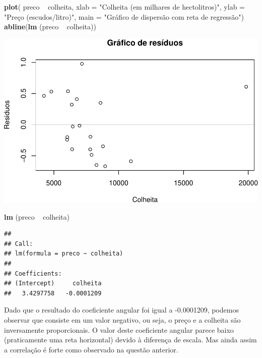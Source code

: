 \documentclass[11pt,]{article}
\makeatletter
\newenvironment{Shaded}{\begin{snugshade}}{\end{snugshade}}
\newcommand{\KeywordTok}[1]{\textcolor[rgb]{0.13,0.29,0.53}{\textbf{{#1}}}}
\newcommand{\DataTypeTok}[1]{\textcolor[rgb]{0.13,0.29,0.53}{{#1}}}
\newcommand{\StringTok}[1]{\textcolor[rgb]{0.31,0.60,0.02}{{#1}}}
\newcommand{\NormalTok}[1]{{#1}}
\def\maxwidth{\ifdim\Gin@nat@width>\linewidth\linewidth
\else\Gin@nat@width\fi}
\let\Oldincludegraphics\includegraphics
\renewcommand{\includegraphics}[1]{\Oldincludegraphics[width=\maxwidth]{#1}}
\makeatother
\begin{document}
\begin{Shaded}
\begin{Highlighting}[]
\KeywordTok{plot}\NormalTok{( preco ~}\StringTok{ }\NormalTok{colheita, }
      \DataTypeTok{xlab =} \StringTok{"Colheita (em milhares de hectolitros)"}\NormalTok{,}
      \DataTypeTok{ylab =} \StringTok{"Preço (escudos/litro)"}\NormalTok{,}
      \DataTypeTok{main =} \StringTok{"Gráfico de dispersão com reta de regressão"}\NormalTok{)}
\KeywordTok{abline}\NormalTok{(}\KeywordTok{lm} \NormalTok{(preco ~}\StringTok{ }\NormalTok{colheita))}
\end{Highlighting}
\end{Shaded}

\includegraphics{versaofinal_lista3_files/figure-latex/unnamed-chunk-4-1.pdf}

\begin{Shaded}
\begin{Highlighting}[]
\KeywordTok{lm} \NormalTok{(preco ~}\StringTok{ }\NormalTok{colheita)}
\end{Highlighting}
\end{Shaded}

\begin{verbatim}
## 
## Call:
## lm(formula = preco ~ colheita)
## 
## Coefficients:
## (Intercept)     colheita  
##   3.4297758   -0.0001209
\end{verbatim}

Dado que o resultado do coeficiente angular foi igual a -0.0001209,
podemos observar que consiste em um valor negativo, ou seja, o preço e a
colheita são inversamente proporcionais. O valor deste coeficiente
angular parece baixo (praticamente uma reta horizontal) devido à
diferença de escala. Mas ainda assim a correlação é forte como observado
na questão anterior.
\end{document}
